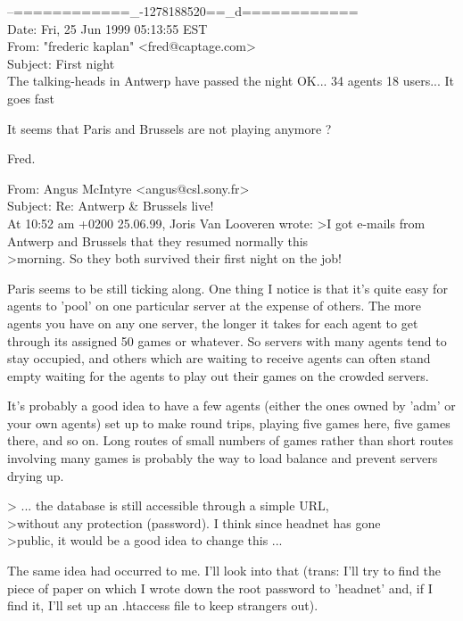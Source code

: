 \begin{mail}
--============\_-1278188520==\_d============\\
Date: Fri, 25 Jun 1999 05:13:55 EST\\
From: "frederic kaplan" <fred@captage.com>\\
Subject: First night\\

The talking-heads in Antwerp have passed the night OK... 
34 agents
18 users... It goes fast

It seems that Paris and Brussels are not playing anymore ?

Fred.
\end{mail}

\begin{mail}
From: Angus McIntyre <angus@csl.sony.fr>\\
Subject: Re: Antwerp \& Brussels live!\\

At 10:52 am +0200 25.06.99, Joris Van Looveren wrote:
>I got e-mails from Antwerp and Brussels that they resumed normally this
\\>morning. So they both survived their first night on the job!

Paris seems to be still ticking along. One thing I notice is that it's 
quite easy for agents to 'pool' on one particular server at the expense 
of others. The more agents you have on any one server, the longer it 
takes for each agent to get through its assigned 50 games or whatever. 
So servers with many agents tend to stay occupied, and others which are 
waiting to receive agents can often stand empty waiting for the agents 
to play out their games on the crowded servers.

It's probably a good idea to have a few agents (either the ones owned 
by 'adm' or your own agents) set up to make round trips, playing five 
games here, five games there, and so on. Long routes of small numbers 
of games rather than short routes involving many games is probably 
the way to load balance and prevent servers drying up.

> ... the database is still accessible through a simple URL,
\\>without any protection (password). I think since headnet has gone
\\>public, it would be a good idea to change this ...

The same idea had occurred to me. I'll look into that (trans: I'll 
try to find the piece of paper on which I wrote down the root password 
to 'headnet' and, if I find it, I'll set up an .htaccess 
file to keep strangers out).


\end{mail}
